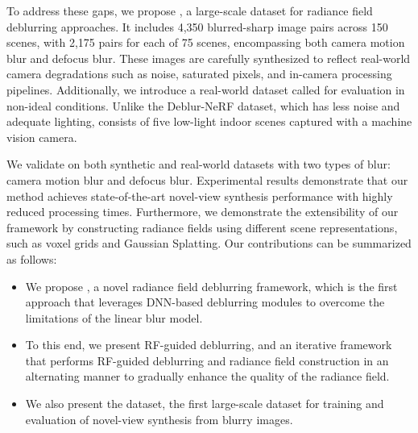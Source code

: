 To address these gaps, we propose \textit{\SynthDataName{}}, a large-scale dataset for radiance field deblurring approaches. It includes 4,350 blurred-sharp image pairs across 150 scenes, with 2,175 pairs for each of 75 scenes, encompassing both camera motion blur and defocus blur. These images are carefully synthesized to reflect real-world camera degradations such as noise, saturated pixels, and in-camera processing pipelines.
Additionally, we introduce a real-world dataset called \textit{\RealDataName{}} for evaluation in non-ideal conditions. Unlike the Deblur-NeRF dataset, which has less noise and adequate lighting, \textit{\RealDataName{}} consists of five low-light indoor scenes captured with a machine vision camera.

We validate \textit{\MethodName{}} on both synthetic and real-world datasets with two types of blur: camera motion blur and defocus blur.
Experimental results demonstrate that our method achieves state-of-the-art novel-view synthesis performance with highly reduced processing times.
Furthermore, we demonstrate the extensibility of our framework by constructing radiance fields using different scene representations, such as voxel grids and Gaussian Splatting.
Our contributions can be summarized as follows:
\begin{itemize}
    \item We propose \textit{\MethodName{}}, a novel radiance field deblurring framework, which is the first approach that leverages DNN-based deblurring modules to overcome the limitations of the linear blur model.
    \item To this end, we present RF-guided deblurring, and an iterative framework that performs RF-guided deblurring and radiance field construction in an alternating manner to gradually enhance the quality of the radiance field.
    \item We also present the \textit{\SynthDataName{}} dataset, the first large-scale dataset for training and evaluation of novel-view synthesis from blurry images.
\end{itemize}
